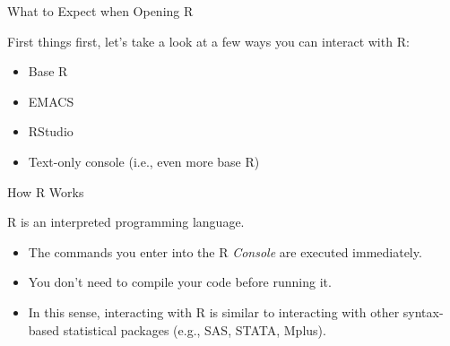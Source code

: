 \documentclass[10pt]{beamer}
\begin{document}

\begin{frame}{What to Expect when Opening R}

  First things first, let's take a look at a few ways you can interact with R:
  \vb
  \begin{itemize}
  \item Base R
    \vb
  \item EMACS
    \vb
  \item RStudio
    \vb
  \item Text-only console (i.e., even more base R)
  \end{itemize}

\end{frame}


\begin{frame}{How R Works}

  R is an interpreted programming language.
  \vb
  \begin{itemize}
  \item The commands you enter into the R \emph{Console} are executed 
    immediately.
    \vc
  \item You don't need to compile your code before running it.
    \vc
  \item In this sense, interacting with R is similar to interacting with other
    syntax-based statistical packages (e.g., SAS, STATA, Mplus).
  \end{itemize}

\end{frame}

\end{document}
